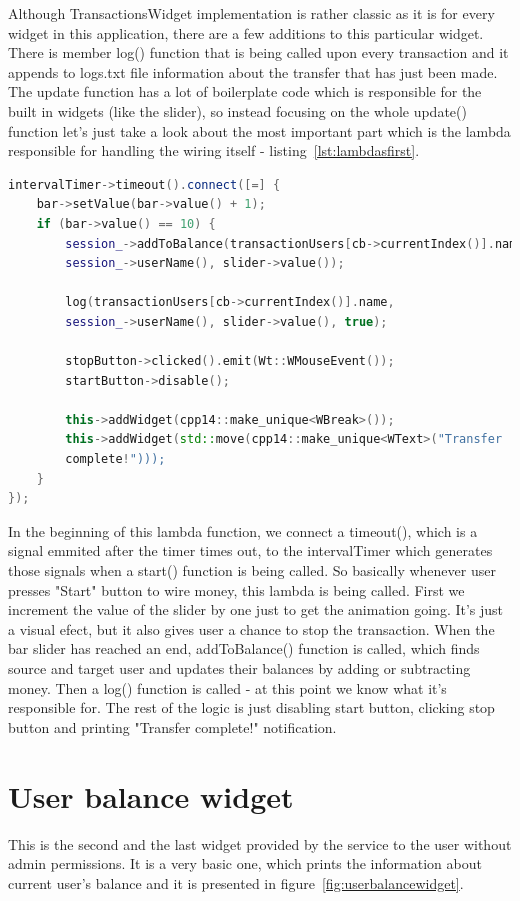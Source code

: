 \documentclass[a4paper,12pt]{book}
\begin{document}
{{\bigskip 
Although TransactionsWidget implementation is rather classic as it is for every widget in this application, there are a few additions to this particular widget. There is member log() function that is being called upon every transaction and it appends to logs.txt file information about the transfer that has just been made. The update function has a lot of boilerplate code which is responsible for the built in widgets (like the slider), so instead focusing on the whole update() function let's just take a look about the most important part which is the lambda responsible for handling the wiring itself - listing~\ref{lst:lambdasfirst}.

\bigskip
\begin{lstlisting}[frame=single, label={lst:lambdasfirst}, basicstyle=\small, language=C++, caption={Part of TransactionWidget::update() function.}, captionpos=b]
intervalTimer->timeout().connect([=] {
	bar->setValue(bar->value() + 1);
	if (bar->value() == 10) {
		session_->addToBalance(transactionUsers[cb->currentIndex()].name,
		session_->userName(), slider->value());
		
		log(transactionUsers[cb->currentIndex()].name, 
		session_->userName(), slider->value(), true);
		
		stopButton->clicked().emit(Wt::WMouseEvent());
		startButton->disable();
		
		this->addWidget(cpp14::make_unique<WBreak>());
		this->addWidget(std::move(cpp14::make_unique<WText>("Transfer 
		complete!")));
	}
});
\end{lstlisting}

In the beginning of this lambda function, we connect a timeout(), which is a signal emmited after the timer times out, to the intervalTimer which generates those signals when a start() function is being called. So basically whenever user presses "Start" button to wire money, this lambda is being called. First we increment the value of the slider by one just to get the animation going. It's just a visual efect, but it also gives user a chance to stop the transaction. When the bar slider has reached an end, addToBalance() function is called, which finds source and target user and updates their balances by adding or subtracting money. Then a log() function is called - at this point we know what it's responsible for. The rest of the logic is just disabling start button, clicking stop button and printing "Transfer complete!" notification.
}

\section*{User balance widget}
{
This is the second and the last widget provided by the service to the user without admin permissions. It is a very basic one, which prints the information about current user's balance and it is presented in figure~\ref{fig:userbalancewidget}.

}}
\end{document}
